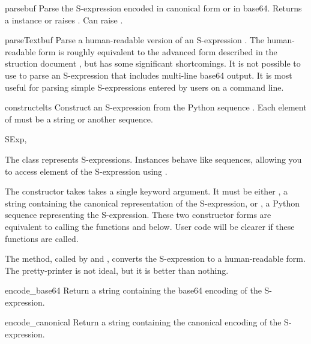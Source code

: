 \documentclass{howto}
\begin{document}
\begin{funcdesc}{parse}{buf}
Parse the S-expression  encoded in canonical form or in
base64.  Returns a  instance or raises
.  Can raise .
\end{funcdesc}

\begin{funcdesc}{parseText}{buf}
Parse a human-readable version of an S-expression .  The
human-readable form is roughly equivalent to the advanced form
described in the struction document \cite{ellison99-structure}, but
has some significant shortcomings.  It is not possible to use
 to parse an S-expression that includes multi-line
base64 output.  It is most useful for parsing simple S-expressions
entered by users on a command line.
\end{funcdesc}

\begin{funcdesc}{construct}{elts}
Construct an S-expression from the Python sequence .  Each
element of  must be a string or another sequence.
\end{funcdesc}

\begin{classdesc}{SExp}{, }

The  class represents S-expressions.  Instances behave
like sequences, allowing you to access element  of the
S-expression using .

The constructor takes takes a single keyword argument.  It must be
either , a string containing the canonical representation
of the S-expression, or , a Python sequence representing the
S-expression.  These two constructor forms are equivalent to calling
the functions  and  below.  User code will
be clearer if these functions are called.

The  method, called by  and
, converts the S-expression to a human-readable form.
The pretty-printer is not ideal, but it is better than nothing.

\begin{methoddesc}{encode_base64}{}
Return a string containing the base64 encoding of the S-expression.
\end{methoddesc}

\begin{methoddesc}{encode_canonical}{}
Return a string containing the canonical encoding of the S-expression.
\end{methoddesc}

\end{classdesc}
\end{document}
